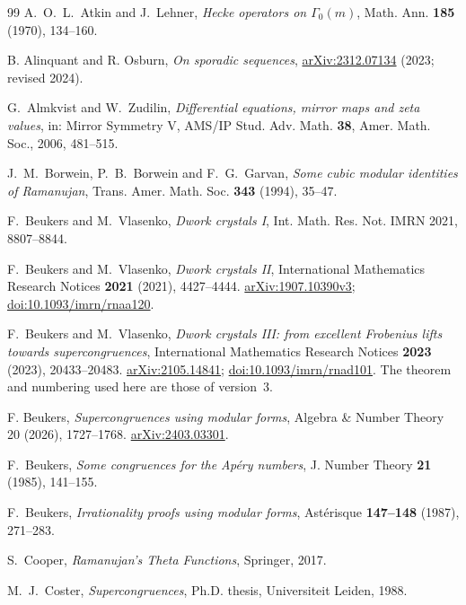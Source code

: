 \documentclass[11pt,a4paper]{article}
\theoremstyle{definition}\newtheorem{definition}[theorem]{Definition}
\theoremstyle{remark}\newtheorem{remark}[theorem]{Remark}
\numberwithin{equation}{section}
\begin{document}
\clearpage
\begin{thebibliography}{99}
A.~O.~L.~Atkin and J.~Lehner, \emph{Hecke operators on $\Gamma_0(m)$}, Math. Ann.
\textbf{185} (1970), 134--160.

B. Alinquant and R. Osburn, \emph{On sporadic sequences},
\href{https://arxiv.org/abs/2312.07134}{arXiv:2312.07134} (2023; revised 2024).

G.~Almkvist and W.~Zudilin, \emph{Differential equations, mirror maps and zeta values},
in: Mirror Symmetry V, AMS/IP Stud. Adv. Math. \textbf{38}, Amer. Math. Soc., 2006, 481--515.

J.~M.~Borwein, P.~B.~Borwein and F.~G.~Garvan, \emph{Some cubic modular identities of Ramanujan},
Trans. Amer. Math. Soc. \textbf{343} (1994), 35--47.

F.~Beukers and M.~Vlasenko, \emph{Dwork crystals I}, Int. Math. Res. Not. IMRN
2021, 8807--8844.

F.~Beukers and M.~Vlasenko, \emph{Dwork crystals II},
International Mathematics Research Notices \textbf{2021} (2021), 4427--4444.
\href{https://arxiv.org/abs/1907.10390}{arXiv:1907.10390v3};
\href{https://doi.org/10.1093/imrn/rnaa120}{doi:10.1093/imrn/rnaa120}.

F.~Beukers and M.~Vlasenko,
\emph{Dwork crystals III: from excellent Frobenius lifts towards
supercongruences}, International Mathematics Research Notices
\textbf{2023} (2023), 20433--20483.
\href{https://arxiv.org/abs/2105.14841}{arXiv:2105.14841};
\href{https://doi.org/10.1093/imrn/rnad101}{doi:10.1093/imrn/rnad101}.
The theorem and numbering used here are those of version~3.

F. Beukers, \emph{Supercongruences using modular forms},
Algebra \& Number Theory 20 (2026), 1727--1768.
\href{https://arxiv.org/abs/2403.03301}{arXiv:2403.03301}.

F.~Beukers, \emph{Some congruences for the Ap\'ery numbers}, J. Number Theory
\textbf{21} (1985), 141--155.

F.~Beukers, \emph{Irrationality proofs using modular forms}, Ast\'erisque \textbf{147--148} (1987),
271--283.

S.~Cooper, \emph{Ramanujan's Theta Functions}, Springer, 2017.

M.~J.~Coster, \emph{Supercongruences}, Ph.D. thesis, Universiteit Leiden, 1988.


\end{thebibliography}
\end{document}
